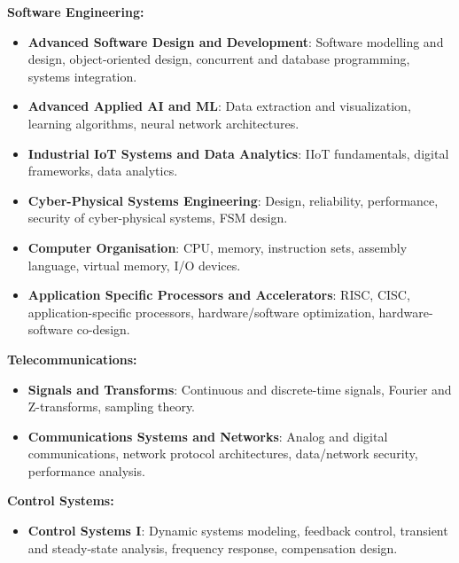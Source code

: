 \documentclass[A4,10pt]{article}
\begin{document}
\begin{itemize}[leftmargin=0.05in, label={}]
{    %
    \item \textbf{Software Engineering:}
    \begin{itemize}[leftmargin=0.15in, label={}]
        \item \textbf{Advanced Software Design and Development}{: Software modelling and design, object-oriented design, concurrent and database programming, systems integration.}\\
        \item \textbf{Advanced Applied AI and ML}{: Data extraction and visualization, learning algorithms, neural network architectures.}\\
        \item \textbf{Industrial IoT Systems and Data Analytics}{: IIoT fundamentals, digital frameworks, data analytics.}\\
        \item \textbf{Cyber-Physical Systems Engineering}{: Design, reliability, performance, security of cyber-physical systems, FSM design.}\\
        \item \textbf{Computer Organisation}{: CPU, memory, instruction sets, assembly language, virtual memory, I/O devices.}\\
        \item \textbf{Application Specific Processors and Accelerators}{: RISC, CISC, application-specific processors, hardware/software optimization, hardware-software co-design.}\\
    \end{itemize}
    
    \item \textbf{Telecommunications:}\\
    \begin{itemize}[leftmargin=0.15in, label={}]
        \item \textbf{Signals and Transforms}{: Continuous and discrete-time signals, Fourier and Z-transforms, sampling theory.}\\
        \item \textbf{Communications Systems and Networks}{: Analog and digital communications, network protocol architectures, data/network security, performance analysis.}\\
    \end{itemize}
    
    \item \textbf{Control Systems:}\\
    \begin{itemize}[leftmargin=0.15in, label={}]
        \item \textbf{Control Systems I}{: Dynamic systems modeling, feedback control, transient and steady-state analysis, frequency response, compensation design.}\\
    \end{itemize}
    }
\end{itemize}

\end{document}
